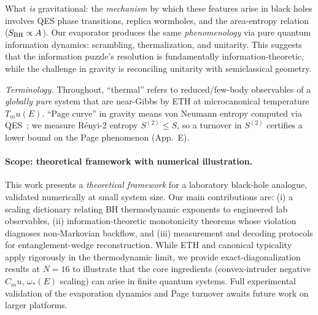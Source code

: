 \documentclass[aps,prx,onecolumn,showpacs,superscriptaddress,longbibliography,nofootinbib]{revtex4-2}
\def\mu{mu}%
\begin{document}
What \emph{is} gravitational: the \emph{mechanism} by which these features arise in black holes involves QES phase transitions, replica wormholes, and the area-entropy relation ($S_{\rm BH} \propto A$). Our evaporator produces the same \emph{phenomenology} via pure quantum information dynamics: scrambling, thermalization, and unitarity. This suggests that the information puzzle's resolution is fundamentally information-theoretic, while the challenge in gravity is reconciling unitarity with semiclassical geometry.

\noindent\textit{Terminology.} Throughout, ``thermal'' refers to reduced/few-body observables of a \emph{globally pure} system that are near-Gibbs by ETH at microcanonical temperature $T_\mu(E)$. ``Page curve'' in gravity means von Neumann entropy computed via QES~\cite{EngelhardtWall2015,AEMM2019,Penington2019}; we measure R\'enyi-2 entropy $S^{(2)} \le S$, so a turnover in $S^{(2)}$ certifies a lower bound on the Page phenomenon (App.~E).

\paragraph*{Scope: theoretical framework with numerical illustration.}
This work presents a \emph{theoretical framework} for a laboratory black-hole analogue, validated numerically at small system size. Our main contributions are: (i) a scaling dictionary relating BH thermodynamic exponents to engineered lab observables, (ii) information-theoretic monotonicity theorems whose violation diagnoses non-Markovian backflow, and (iii) measurement and decoding protocols for entanglement-wedge reconstruction. While ETH and canonical typicality apply rigorously in the thermodynamic limit, we provide exact-diagonalization results at $N{=}16$ to illustrate that the core ingredients (convex-intruder negative $C_\mu$, $\omega_\ast(E)$ scaling) can arise in finite quantum systems. Full experimental validation of the evaporation dynamics and Page turnover awaits future work on larger platforms.
\end{document}

